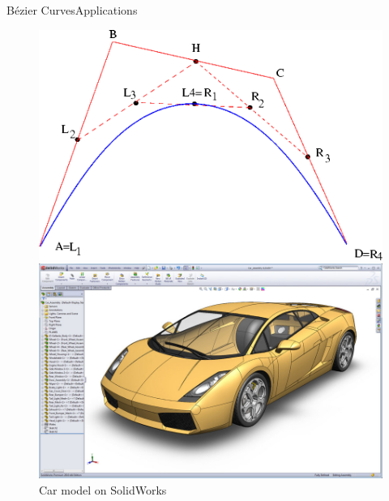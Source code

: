 \documentclass[10pt]{beamer}
\begin{document}
\begin{frame}{Bézier Curves}{Applications}
\begin{figure}[H]
    \hspace{5cm}
    \begin{minipage}{0.50\linewidth}
      \begin{overprint}
        \vspace{-4cm}
        \includegraphics[scale=0.4]{curve.png}
        \begin{center}
        \caption{Quadratic Bézier-Curve\footnotemark[1]}
        \end{center}
        \vspace{-4cm}
        \includegraphics[scale=0.2]{CADcar.png}
        \begin{center}
          \caption{Car model on SolidWorks \footnotemark[2]}
          \end{center}
        \vspace{-3.5cm}
        \begin{center}

\end{center}
\end{overprint}
\end{minipage}
\end{figure}
\end{frame}
\end{document}
